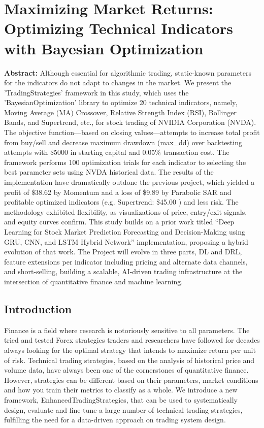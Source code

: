 \chapter{Maximizing Market Returns: Optimizing Technical Indicators with Bayesian Optimization}

\textbf{Abstract:} Although essential for algorithmic trading, static-known parameters for the indicators do not adapt to changes in the market. We present the 'TradingStrategies' framework in this study, which uses the 'BayesianOptimization' library to optimize 20 technical indicators, namely, Moving Average (MA) Crossover, Relative Strength Index (RSI), Bollinger Bands, and Supertrend, etc., for stock trading of NVIDIA Corporation (NVDA).  The objective function—based on closing values—attempts to increase total profit from buy/sell and decrease maximum drawdown (max\_dd) over backtesting attempts with \$5000 in starting capital and 0.05\% transaction cost. The framework performs 100 optimization trials for each indicator to selecting the best parameter sets using NVDA historical data. The results of the implementation have dramatically outdone the previous project, which yielded a profit of \$38.62 by Momentum and a loss of \$9.89 by Parabolic SAR and profitable optimized indicators (e.g. Supertrend: \$45.00 ) and less risk. The methodology exhibited flexibility, as visualizations of price, entry/exit signals, and equity curves confirm. This study builds on a prior work titled “Deep Learning for Stock Market Prediction\: Forecasting and Decision-Making using GRU, CNN, and LSTM Hybrid Network” implementation, proposing a hybrid evolution of that work. The Project will evolve in three parts, DL and DRL, feature extensions per indicator including pricing and alternate data channels, and short-selling, building a scalable, AI-driven trading infrastructure at the intersection of quantitative finance and machine learning.

\section{Introduction}
Finance is a field where research is notoriously sensitive to all parameters. The tried and tested Forex strategies traders and researchers have followed for decades always looking for the optimal strategy that intends to maximize return per unit of risk. Technical trading strategies, based on the analysis of historical price and volume data, have always been one of the cornerstones of quantitative finance. However, strategies can be different based on their parameters, market conditions and how you train their metrics to classify as a whole. We introduce a new framework, EnhancedTradingStrategies, that can be used to systematically design, evaluate and fine-tune a large number of technical trading strategies, fulfilling the need for a data-driven approach on trading system design.

